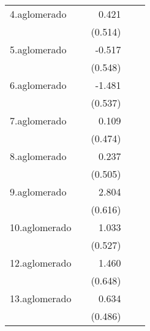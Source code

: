 {\begin{longtable}{l*{4}{D{.}{.}{-1}}}
\addlinespace
4.aglomerado&                     &       0.421         &                     &                     \\
            &                     &     (0.514)         &                     &                     \\
\addlinespace
5.aglomerado&                     &      -0.517         &                     &                     \\
            &                     &     (0.548)         &                     &                     \\
\addlinespace
6.aglomerado&                     &      -1.481\sym{**} &                     &                     \\
            &                     &     (0.537)         &                     &                     \\
\addlinespace
7.aglomerado&                     &       0.109         &                     &                     \\
            &                     &     (0.474)         &                     &                     \\
\addlinespace
8.aglomerado&                     &       0.237         &                     &                     \\
            &                     &     (0.505)         &                     &                     \\
\addlinespace
9.aglomerado&                     &       2.804\sym{***}&                     &                     \\
            &                     &     (0.616)         &                     &                     \\
\addlinespace
10.aglomerado&                     &       1.033\sym{*}  &                     &                     \\
            &                     &     (0.527)         &                     &                     \\
\addlinespace
12.aglomerado&                     &       1.460\sym{*}  &                     &                     \\
            &                     &     (0.648)         &                     &                     \\
\addlinespace
13.aglomerado&                     &       0.634         &                     &                     \\
            &                     &     (0.486)         &                     &                     \\

\end{longtable}}
